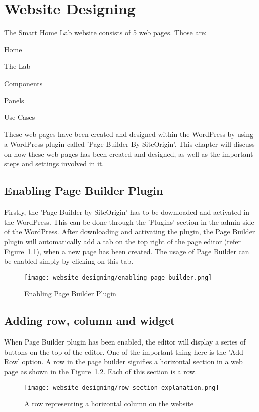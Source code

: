 \chapter{Website Designing}
The Smart Home Lab website consists of 5 web pages. Those are:
\begin{itemize*}
\item Home
\item The Lab
\item Components
\item Panels
\item Use Cases
\end{itemize*}

These web pages have been created and designed within the WordPress by using a WordPress plugin called 'Page Builder By SiteOrigin'. This chapter will discuss on how these web pages has been created and designed, as well as the important steps and settings involved in it.

\section{Enabling Page Builder Plugin}
Firstly, the 'Page Builder by SiteOrigin' has to be downloaded and activated in the WordPress. This can be done through the 'Plugins' section in the admin side of the WordPress. After downloading and activating the plugin, the Page Builder plugin will automatically add a tab on the top right of the page editor (refer Figure~\ref{enabling-page-builder}), when a new page has been created. The usage of Page Builder can be enabled simply by clicking on this tab.

\begin{figure}[ht]
\centering
\caption{Enabling Page Builder Plugin}
\label{enabling-page-builder}
\texttt{[image: website-designing/enabling-page-builder.png]}
\end{figure}

\section{Adding row, column and widget}
When Page Builder plugin has been enabled, the editor will display a series of buttons on the top of the editor. One of the important thing here is the 'Add Row' option. A row in the page builder signifies a horizontal section in a web page as shown in the Figure~\ref{row-section-explanation}. Each of this section is a row.

\begin{figure}[ht]
\centering
\caption{A row representing a horizontal column on the website}
\label{row-section-explanation}
\texttt{[image: website-designing/row-section-explanation.png]}
\end{figure}

